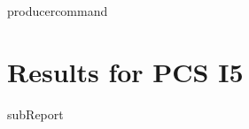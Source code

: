 {{ producercommand }}
\renewcommand{\DTRPcs}{I5} %
\renewcommand{\DTRPcsLong}{I5}


    \section{Results for PCS \DTRPcsLong}

    {{subReport}}
    \newpage

